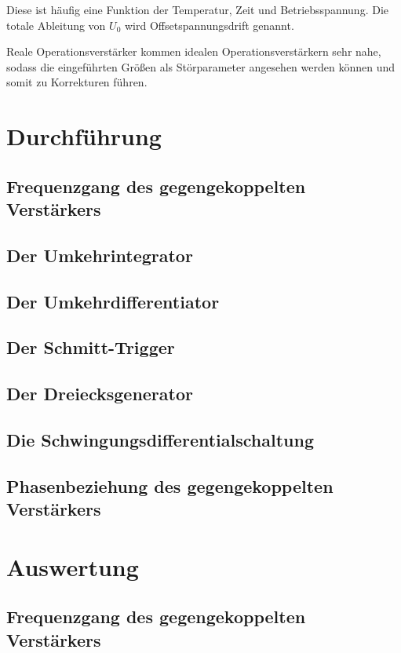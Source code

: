 \documentclass[]{scrartcl}
\begin{document}
Diese ist häufig eine Funktion der Temperatur, Zeit und Betriebsspannung. Die totale Ableitung von $U_{0}$ wird Offsetspannungsdrift genannt.

Reale Operationsverstärker kommen idealen Operationsverstärkern sehr nahe, sodass die eingeführten Größen als Störparameter angesehen werden können und somit zu Korrekturen führen.


\section{Durchführung}

\subsection{Frequenzgang des gegengekoppelten Verstärkers}

\subsection{Der Umkehrintegrator}

\subsection{Der Umkehrdifferentiator}

\subsection{Der Schmitt-Trigger}

\subsection{Der Dreiecksgenerator}

\subsection{Die Schwingungsdifferentialschaltung}

\subsection{Phasenbeziehung des gegengekoppelten Verstärkers}

\section{Auswertung}

\subsection{Frequenzgang des gegengekoppelten Verstärkers}
\end{document}

